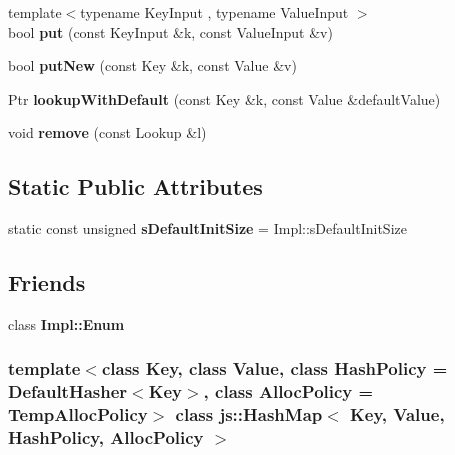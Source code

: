 \begin{DoxyCompactItemize}
\item 
\hypertarget{classjs_1_1_hash_map_a17b45d78e5fbd400362300df53340bc4}{{\footnotesize template$<$typename Key\-Input , typename Value\-Input $>$ }\\bool {\bfseries put} (const Key\-Input \&k, const Value\-Input \&v)}\label{classjs_1_1_hash_map_a17b45d78e5fbd400362300df53340bc4}

\item 
\hypertarget{classjs_1_1_hash_map_aab52dabd5cddb16505b30f5680636be2}{bool {\bfseries put\-New} (const Key \&k, const Value \&v)}\label{classjs_1_1_hash_map_aab52dabd5cddb16505b30f5680636be2}

\item 
\hypertarget{classjs_1_1_hash_map_aa473493e3a444b6cee87317d7b0f9149}{Ptr {\bfseries lookup\-With\-Default} (const Key \&k, const Value \&default\-Value)}\label{classjs_1_1_hash_map_aa473493e3a444b6cee87317d7b0f9149}

\item 
\hypertarget{classjs_1_1_hash_map_aa728bda0c21c4eccd7da13fa9d38ecf8}{void {\bfseries remove} (const Lookup \&l)}\label{classjs_1_1_hash_map_aa728bda0c21c4eccd7da13fa9d38ecf8}

\end{DoxyCompactItemize}
\subsection*{Static Public Attributes}
\begin{DoxyCompactItemize}
\item 
\hypertarget{classjs_1_1_hash_map_a1127cc93c08a14c61a89847d61da5af5}{static const unsigned {\bfseries s\-Default\-Init\-Size} = Impl\-::s\-Default\-Init\-Size}\label{classjs_1_1_hash_map_a1127cc93c08a14c61a89847d61da5af5}

\end{DoxyCompactItemize}
\subsection*{Friends}
\begin{DoxyCompactItemize}
\item 
\hypertarget{classjs_1_1_hash_map_ac2ba4b9aa066ee5fb781cf50b128569c}{class {\bfseries Impl\-::\-Enum}}\label{classjs_1_1_hash_map_ac2ba4b9aa066ee5fb781cf50b128569c}

\end{DoxyCompactItemize}
\subsubsection*{template$<$class Key, class Value, class Hash\-Policy = Default\-Hasher$<$\-Key$>$, class Alloc\-Policy = Temp\-Alloc\-Policy$>$ class js\-::\-Hash\-Map$<$ Key, Value, Hash\-Policy, Alloc\-Policy $>$}




